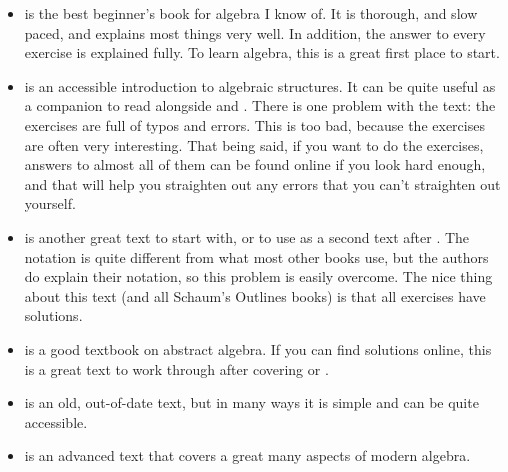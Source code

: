 \documentclass[../../../main.tex]{subfiles}
\begin{document}
\begin{itemize}

  \item \citet{DosReisAndDosReis2017} is the best beginner's book for algebra I know of. It is thorough, and slow paced, and explains most things very well. In addition, the answer to every exercise is explained fully. To learn algebra, this is a great first place to start.
  
  \item \citet{Pinter2010} is an accessible introduction to algebraic structures. It can be quite useful as a companion to read alongside \citet{DosReisAndDosReis2017} and \citet{BaumslagAndChandler1968}. There is one problem with the text: the exercises are full of typos and errors. This is too bad, because the exercises are often very interesting. That being said, if you want to do the exercises, answers to almost all of them can be found online if you look hard enough, and that will help you straighten out any errors that you can't straighten out yourself.
  
  \item \citet{BaumslagAndChandler1968} is another great text to start with, or to use as a second text after \citet{DosReisAndDosReis2017}. The notation is quite different from what most other books use, but the authors do explain their notation, so this problem is easily overcome. The nice thing about this text (and all Schaum's Outlines books) is that all exercises have solutions.
  
  \item \citet{Saracino2008} is a good textbook on abstract algebra. If you can find solutions online, this is a great text to work through after covering \citet{DosReisAndDosReis2017} or \citet{BaumslagAndChandler1968}.

  \item \citet{Schmidt1966} is an old, out-of-date text, but in many ways it is simple and can be quite accessible.
  
  \item \citet{Warner1990} is an advanced text that covers a great many aspects of modern algebra.

\end{itemize}
\end{document}

